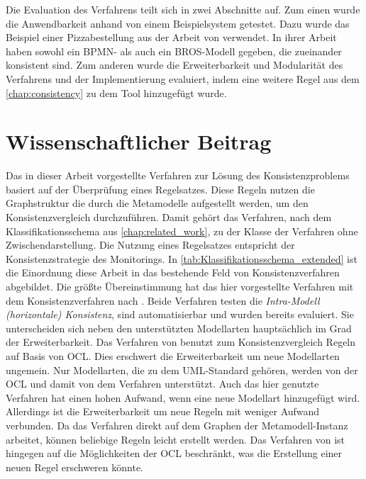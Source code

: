Die Evaluation des Verfahrens teilt sich in zwei Abschnitte auf.
Zum einen wurde die Anwendbarkeit anhand von einem Beispielsystem getestet.
Dazu wurde das Beispiel einer Pizzabestellung aus der Arbeit von \cite{Schoen} verwendet.
In ihrer Arbeit haben \cite{Schoen} sowohl ein BPMN- als auch ein BROS-Modell gegeben, die zueinander konsistent sind.
Zum anderen wurde die Erweiterbarkeit und Modularität des Verfahrens und der Implementierung evaluiert, indem eine weitere Regel aus dem \cref{chap:consistency} zu dem Tool hinzugefügt wurde.

\section{Wissenschaftlicher Beitrag}

Das in dieser Arbeit vorgestellte Verfahren zur Lösung des Konsistenzproblems basiert auf der Überprüfung eines Regelsatzes.
Diese Regeln nutzen die Graphstruktur die durch die Metamodelle aufgestellt werden, um den Konsistenzvergleich durchzuführen.
Damit gehört das Verfahren, nach dem Klassifikationsschema aus \cref{chap:related_work}, zu der Klasse der Verfahren ohne Zwischendarstellung.
Die Nutzung eines Regelsatzes entspricht der Konsistenzstrategie des Monitorings.
In \cref{tab:Klassifikationsschema_extended} ist die Einordnung diese Arbeit in das bestehende Feld von Konsistenzverfahren abgebildet.
Die größte Übereinstimmung hat das hier vorgestellte Verfahren mit dem Konsistenzverfahren nach \cite{Egyed2006}.
Beide Verfahren testen die \emph{Intra-Modell (horizontale) Konsistenz}, sind automatisierbar und wurden bereits evaluiert.
Sie unterscheiden sich neben den unterstützten Modellarten hauptsächlich im Grad der Erweiterbarkeit.
Das Verfahren von \cite{Egyed2006} benutzt zum Konsistenzvergleich Regeln auf Basis von OCL.
Dies erschwert die Erweiterbarkeit um neue Modellarten ungemein.
Nur Modellarten, die zu dem UML-Standard gehören, werden von der OCL und damit von dem Verfahren unterstützt.
Auch das hier genutzte Verfahren hat einen hohen Aufwand, wenn eine neue Modellart hinzugefügt wird.
Allerdings ist die Erweiterbarkeit um neue Regeln mit weniger Aufwand verbunden.
Da das Verfahren direkt auf dem Graphen der Metamodell-Instanz arbeitet, können beliebige Regeln leicht erstellt werden.
Das Verfahren von \cite{Egyed2006} ist hingegen auf die Möglichkeiten der OCL beschränkt, was die Erstellung einer neuen Regel erschweren könnte.

